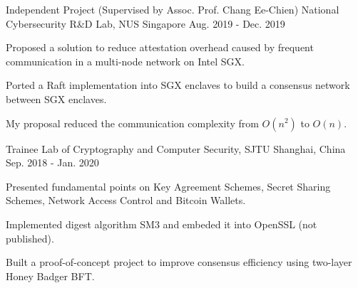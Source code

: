 \begin{cventries}

    \cventry
    {Independent Project (Supervised by Assoc. Prof. Chang Ee-Chien)} %
    {National Cybersecurity R\&D Lab, NUS} %
    {Singapore} %
    {Aug. 2019 - Dec. 2019} %
    { %
        \begin{cvitems}
            \item Proposed a solution to reduce attestation overhead caused by frequent communication in a multi-node network on Intel SGX.
            \item Ported a {Raft} implementation into SGX enclaves to build a consensus network between SGX enclaves.
            \item My proposal reduced the communication complexity from \(O\left(n^2\right)\) to \(O(n)\).
        \end{cvitems}
    }


    \cventry
    {Trainee} %
    {Lab of Cryptography and Computer Security, SJTU} %
    {Shanghai, China} %
    {Sep. 2018 - Jan. 2020} %
    { %
        \begin{cvitems}
            \item Presented fundamental points on {Key Agreement Schemes}, {Secret Sharing Schemes}, {Network Access Control} and {Bitcoin Wallets}.
            \item Implemented digest algorithm {SM3} and embeded it into {OpenSSL} (not published).
            \item Built a proof-of-concept project to improve consensus efficiency using two-layer Honey Badger BFT.
        \end{cvitems}
    }


\end{cventries}
